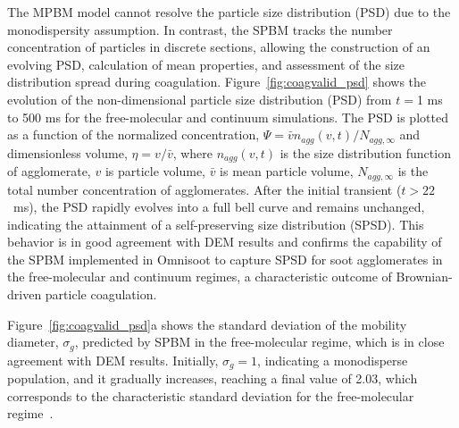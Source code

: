 The MPBM model cannot resolve the particle size distribution (PSD) due to the monodispersity assumption. In contrast, the SPBM tracks the number concentration of particles in discrete sections, allowing the construction of an evolving PSD, calculation of mean properties, and assessment of the size distribution spread during coagulation. Figure~\ref{fig:coagvalid_psd} shows the evolution of the non-dimensional particle size distribution (PSD) from $t=$1 ms to 500 ms for the free-molecular and continuum simulations. The PSD is plotted as a function of the normalized concentration, ${\Psi= \bar{v}n_{agg}(v,t)/N_{agg,\infty}}$ and dimensionless volume, ${\eta= v/ \bar{v}}$, where ${n_{agg}(v,t)}$ is the size distribution function of agglomerate, ${v}$ is particle volume, ${\bar{v}}$ is mean particle volume, ${N_{agg,\infty}}$ is the total number concentration of agglomerates. After the initial transient ($t>22$~ms), the PSD rapidly evolves into a full bell curve and remains unchanged, indicating the attainment of a self-preserving size distribution (SPSD). This behavior is in good agreement with DEM results and confirms the capability of the SPBM implemented in Omnisoot to capture SPSD for soot agglomerates in the free-molecular and continuum regimes, a characteristic outcome of Brownian-driven particle coagulation.


Figure~\ref{fig:coagvalid_psd}a shows the standard deviation of the mobility diameter, ${\sigma_g}$, predicted by SPBM in the free-molecular regime, which is in close agreement with DEM results. Initially, ${\sigma_g}=1$, indicating a monodisperse population, and it gradually increases, reaching a final value of 2.03, which corresponds to the characteristic standard deviation for the free-molecular regime~\citep{vemury1995self}.


